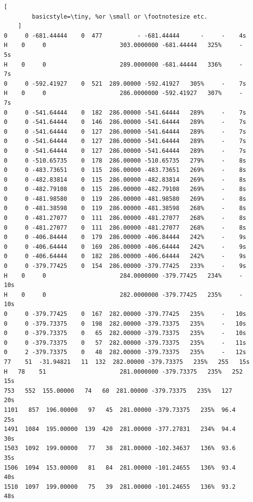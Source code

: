 \documentclass{article}
\begin{document}
\begin{lstlisting}[
        basicstyle=\tiny, %or \small or \footnotesize etc.
    ]
0     0 -681.44444    0  477          - -681.44444      -     -    4s
H    0     0                     303.0000000 -681.44444   325%     -    5s
H    0     0                     289.0000000 -681.44444   336%     -    7s
0     0 -592.41927    0  521  289.00000 -592.41927   305%     -    7s
H    0     0                     286.0000000 -592.41927   307%     -    7s
0     0 -541.64444    0  182  286.00000 -541.64444   289%     -    7s
0     0 -541.64444    0  146  286.00000 -541.64444   289%     -    7s
0     0 -541.64444    0  127  286.00000 -541.64444   289%     -    7s
0     0 -541.64444    0  127  286.00000 -541.64444   289%     -    7s
0     0 -541.64444    0  127  286.00000 -541.64444   289%     -    7s
0     0 -510.65735    0  178  286.00000 -510.65735   279%     -    8s
0     0 -483.73651    0  115  286.00000 -483.73651   269%     -    8s
0     0 -482.83814    0  115  286.00000 -482.83814   269%     -    8s
0     0 -482.79108    0  115  286.00000 -482.79108   269%     -    8s
0     0 -481.98580    0  119  286.00000 -481.98580   269%     -    8s
0     0 -481.38598    0  119  286.00000 -481.38598   268%     -    8s
0     0 -481.27077    0  111  286.00000 -481.27077   268%     -    8s
0     0 -481.27077    0  111  286.00000 -481.27077   268%     -    8s
0     0 -406.84444    0  179  286.00000 -406.84444   242%     -    9s
0     0 -406.64444    0  169  286.00000 -406.64444   242%     -    9s
0     0 -406.64444    0  182  286.00000 -406.64444   242%     -    9s
0     0 -379.77425    0  154  286.00000 -379.77425   233%     -    9s
H    0     0                     284.0000000 -379.77425   234%     -   10s
H    0     0                     282.0000000 -379.77425   235%     -   10s
0     0 -379.77425    0  167  282.00000 -379.77425   235%     -   10s
0     0 -379.73375    0  198  282.00000 -379.73375   235%     -   10s
0     0 -379.73375    0   65  282.00000 -379.73375   235%     -   10s
0     0 -379.73375    0   57  282.00000 -379.73375   235%     -   11s
0     2 -379.73375    0   48  282.00000 -379.73375   235%     -   12s
77    51  -31.94821   11  132  282.00000 -379.73375   235%   255   15s
H   78    51                     281.0000000 -379.73375   235%   252   15s
753   552  155.00000   74   60  281.00000 -379.73375   235%   127   20s
1101   857  196.00000   97   45  281.00000 -379.73375   235%  96.4   25s
1491  1084  195.00000  139  420  281.00000 -377.27831   234%  94.4   30s
1503  1092  199.00000   77   38  281.00000 -102.34637   136%  93.6   35s
1506  1094  153.00000   81   84  281.00000 -101.24655   136%  93.4   40s
1510  1097  199.00000   75   39  281.00000 -101.24655   136%  93.2   48s

\end{lstlisting}
\end{document}
